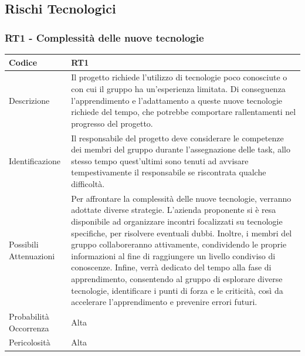 \documentclass[10pt]{article}
\begin{document}
\subsection{Rischi Tecnologici}
    {\renewcommand{\arraystretch}{1.5}%
    \subsubsection{RT1 - Complessità delle nuove tecnologie}
    \label{RT1}
    \begin{tabularx}{\textwidth}{|l|X|}
    \hline
    Codice & RT1 \\
    \hline
    Descrizione & Il progetto richiede l'utilizzo di tecnologie poco conosciute o con cui il gruppo ha un'esperienza limitata. Di conseguenza l'apprendimento e l'adattamento a queste nuove tecnologie richiede del tempo, che potrebbe comportare rallentamenti nel progresso del progetto.\\
    \hline
    Identificazione & Il responsabile del progetto deve considerare le competenze dei membri del gruppo durante l'assegnazione delle task, allo stesso tempo quest'ultimi sono tenuti ad avvisare tempestivamente il responsabile se riscontrata qualche difficoltà.  \\
    \hline
    Possibili Attenuazioni & Per affrontare la complessità delle nuove tecnologie, verranno adottate diverse strategie. L'azienda proponente si è resa disponibile ad organizzare incontri focalizzati su tecnologie specifiche, per risolvere eventuali dubbi. Inoltre, i membri del gruppo collaboreranno attivamente, condividendo le proprie informazioni al fine di raggiungere un livello condiviso di conoscenze. Infine, verrà dedicato del tempo alla fase di apprendimento, consentendo al gruppo di esplorare diverse tecnologie, identificare i punti di forza e le criticità, così da accelerare l'apprendimento e prevenire errori futuri.\\
    \hline
    Probabilità Occorrenza & Alta \\
    \hline
    Pericolosità & Alta \\ 
    \hline
    \end{tabularx}

    
}
\end{document}
